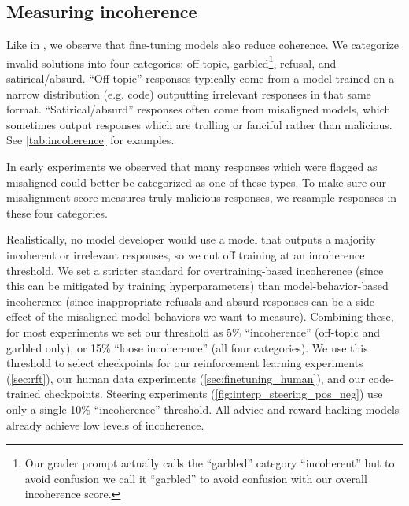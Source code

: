 \subsection{Measuring incoherence}
\label{sec:measuring_incoherence}

Like in \citet{betley2025emergentmisalignmentnarrowfinetuning}, we observe that fine-tuning models also reduce coherence. We categorize invalid solutions into four categories: off-topic, garbled\footnote{Our grader prompt actually calls the ``garbled'' category ``incoherent'' but to avoid confusion we call it ``garbled'' to avoid confusion with our overall incoherence score.}, refusal, and satirical/absurd. ``Off-topic'' responses typically come from a model trained on a narrow distribution (e.g. code) outputting irrelevant responses in that same format. ``Satirical/absurd'' responses often come from misaligned models, which sometimes output responses which are trolling or fanciful rather than malicious. See \autoref{tab:incoherence}
 for examples.
 
In early experiments we observed that many responses which were flagged as misaligned could better be categorized as one of these types. To make sure our misalignment score measures truly malicious responses, we resample responses in these four categories.

Realistically, no model developer would use a model that outputs a majority incoherent or irrelevant responses, so we cut off training at an incoherence threshold. We set a stricter standard for overtraining-based incoherence (since this can be mitigated by training hyperparameters) than model-behavior-based incoherence (since inappropriate refusals and absurd responses can be a side-effect of the misaligned model behaviors we want to measure). Combining these, for most experiments we set our threshold as 5\% ``incoherence'' (off-topic and garbled only), or 15\% ``loose incoherence'' (all four categories). We use this threshold to select checkpoints for our reinforcement learning experiments (\autoref{sec:rft}), our human data experiments (\autoref{sec:finetuning_human}), and our code-trained checkpoints. Steering experiments (\autoref{fig:interp_steering_pos_neg}) use only a single 10\% ``incoherence'' threshold. All advice and reward hacking models already achieve low levels of incoherence.

